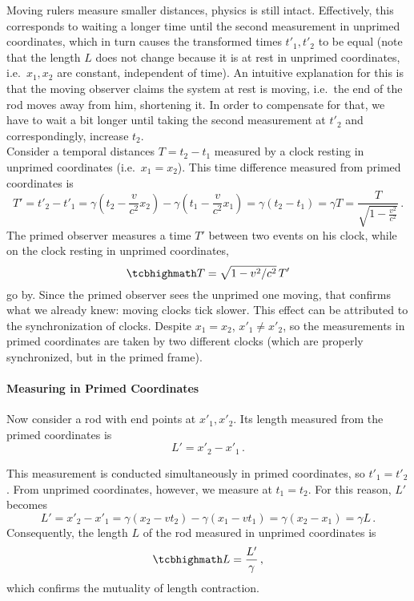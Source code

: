 Moving rulers measure smaller distances, physics is still intact.
Effectively, this corresponds to waiting a longer time until the second measurement in unprimed coordinates, which in turn causes the transformed times $t'_1, t'_2$ to be equal (note that the length $L$ does not change because it is at rest in unprimed coordinates, i.e.~$x_1, x_2$ are constant, independent of time). An intuitive explanation for this is that the moving observer claims the system at rest is moving, i.e.~the end of the rod moves away from him, shortening it. In order to compensate for that, we have to wait a bit longer until taking the second measurement at $t'_2$ and correspondingly, increase $t_2$.\\


Consider a temporal distances $T = t_2 - t_1$ measured by a clock resting in unprimed coordinates (i.e.~$x_1 = x_2$). This time difference measured from primed coordinates is
\begin{equation*}
	T' = t'_2 - t'_1 = \gamma (t_2 - \frac{v}{c^2} x_2) - \gamma (t_1 - \frac{v}{c^2} x_1) = \gamma (t_2 - t_1) = \gamma T = \frac{T}{\sqrt{1 - \frac{v^2}{c^2}}} \, .
\end{equation*}
The primed observer measures a time $T'$ between two events on his clock, while on the clock resting in unprimed coordinates,
\begin{equation}
	\eqbox{
	T = \sqrt{1 - v^2 / c^2} \, T'
	}
\end{equation}
go by. Since the primed observer sees the unprimed one moving, that confirms what we already knew: moving clocks tick slower. This effect can be attributed to the synchronization of clocks. Despite $x_1 = x_2$, $x'_1 \neq x'_2$, so the measurements in primed coordinates are taken by two different clocks (which are properly synchronized, but in the primed frame).



			\paragraph{Measuring in Primed Coordinates}
Now consider a rod with end points at $x'_1, x'_2$. Its length measured from the primed coordinates is
\begin{equation*}\label{eq:rod_primed_coords_from_primed}
	L' = x'_2 - x'_1 \, .
\end{equation*}

This measurement is conducted simultaneously in primed coordinates, so $t'_1 = t'_2$. From unprimed coordinates, however, we measure at $t_1 = t_2$. For this reason, $L'$ becomes
\begin{equation*}
	L' = x'_2 - x'_1 = \gamma (x_2 - v t_2) - \gamma (x_1 - v t_1) = \gamma (x_2 - x_1) = \gamma L \, .
\end{equation*}
Consequently, the length $L$ of the rod measured in unprimed coordinates is
\begin{equation}
	\eqbox{
	L = \frac{L'}{\gamma}
	} \, ,
\end{equation}
which confirms the mutuality of length contraction.


